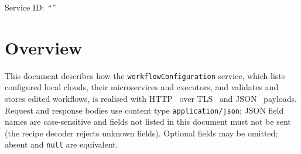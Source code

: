 \documentclass[a4paper]{arrowhead}
\begin{document}
\ArrowheadSetup

\begin{center}
  \vspace*{1cm}
  \huge{\arrowtitle}

  \vspace*{0.2cm}
  \LARGE{\arrowtype}
  \vspace*{1cm}

  \Large{Service ID: \textit{``\arrowid''}}
  \vspace*{\fill}

  

  \vspace*{1cm}
  \vspace*{\fill}

  \begin{abstract}
    This document describes the HTTP/TLS/JSON interface of the \texttt{workflow\allowbreak{}Configuration} service of the Eclipse Arrowhead workflow support systems, service version 1.0.0, documentation edition 5.4.0. It realises the abstract operations of the \texttt{workflow\allowbreak{}Configuration} SD.
  \end{abstract}

  \vspace*{1cm}
\end{center}

\newpage

\tableofcontents
\newpage

\section{Overview}
\label{sec:overview}
This document describes how the \texttt{workflow\allowbreak{}Configuration} service, which lists configured local clouds, their microservices and executors, and validates and stores edited workflows, is realised with HTTP~\cite{rfc9110}
over TLS~\cite{rfc8446} and JSON~\cite{rfc8259} payloads. Request and response bodies use content type
\texttt{application/\allowbreak{}json}; JSON field names are case-sensitive and fields not listed in this document must not be sent
(the recipe decoder rejects unknown fields). Optional fields may be omitted; absent and \texttt{null} are equivalent.
\end{document}
